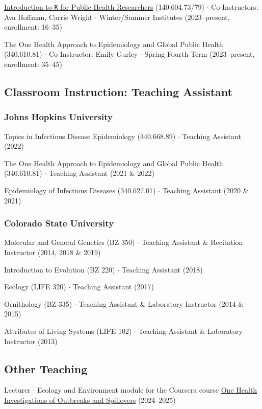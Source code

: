 \documentclass{cv}
\begin{document}
\href{https://jhudatascience.org/intro_to_r/}{Introduction to \texttt{R} for Public Health Researchers} (140.604.73/79) $\cdot$ Co-Instructors: Ava Hoffman, Carrie Wright $\cdot$ Winter/Summer Institutes (2023--present, enrollment: 16--35)

The One Health Approach to Epidemiology and Global Public Health (340.610.81) $\cdot$ Co-Instructor: Emily Gurley $\cdot$ Spring Fourth Term (2023--present, enrollment: 35--45)

\subsection*{Classroom Instruction: Teaching Assistant}

\subsubsection*{Johns Hopkins University}

Topics in Infectious Disease Epidemiology (340.668.89) $\cdot$ Teaching Assistant (2022)

The One Health Approach to Epidemiology and Global Public Health (340.610.81) $\cdot$ Teaching Assistant (2021 \& 2022)

Epidemiology of Infectious Diseases (340.627.01) $\cdot$ Teaching Assistant (2020 \& 2021)

\subsubsection*{Colorado State University}

Molecular and General Genetics (BZ 350) $\cdot$ Teaching Assistant \& Recitation Instructor (2014, 2018 \& 2019)

Introduction to Evolution (BZ 220) $\cdot$ Teaching Assistant (2018)

Ecology (LIFE 320) $\cdot$ Teaching Assistant (2017)

Ornithology (BZ 335) $\cdot$ Teaching Assistant \& Laboratory Instructor (2014 \& 2015)

Attributes of Living Systems (LIFE 102) $\cdot$ Teaching Assistant \& Laboratory Instructor (2013)

\subsection*{Other Teaching}

Lecturer $\cdot$ Ecology and Environment module for the Coursera course \href{https://www.coursera.org/learn/one-health-investigations-of-outbreaks-and-spillover-events}{One Health Investigations of Outbreaks and Spillovers} (2024--2025)
\end{document}
